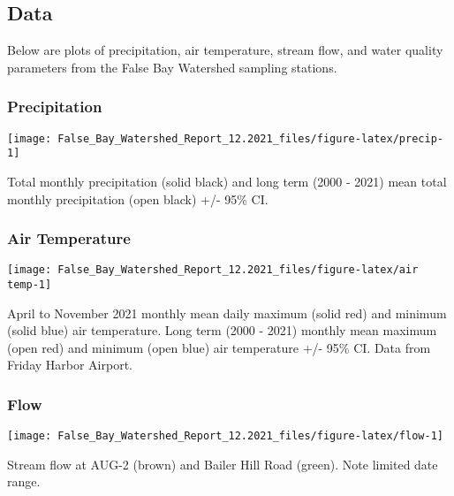 \documentclass[
]{article}
\begin{document}
\hypertarget{data}{%
\subsection{Data}\label{data}}

Below are plots of precipitation, air temperature, stream flow, and
water quality parameters from the False Bay Watershed sampling stations.

\newpage

\hypertarget{precipitation}{%
\subsubsection{Precipitation}\label{precipitation}}

\begin{center}\texttt{[image: False\_Bay\_Watershed\_Report\_12.2021\_files/figure-latex/precip-1]} \end{center}

Total monthly precipitation (solid black) and long term (2000 - 2021)
mean total monthly precipitation (open black) +/- 95\% CI.

\hypertarget{air-temperature}{%
\subsubsection{Air Temperature}\label{air-temperature}}

\begin{center}\texttt{[image: False\_Bay\_Watershed\_Report\_12.2021\_files/figure-latex/air temp-1]} \end{center}

April to November 2021 monthly mean daily maximum (solid red) and
minimum (solid blue) air temperature. Long term (2000 - 2021) monthly
mean maximum (open red) and minimum (open blue) air temperature +/- 95\%
CI. Data from Friday Harbor Airport.

\hypertarget{flow}{%
\subsubsection{Flow}\label{flow}}

\begin{center}\texttt{[image: False\_Bay\_Watershed\_Report\_12.2021\_files/figure-latex/flow-1]} \end{center}

Stream flow at AUG-2 (brown) and Bailer Hill Road (green). Note limited
date range.

\newpage
\end{document}
